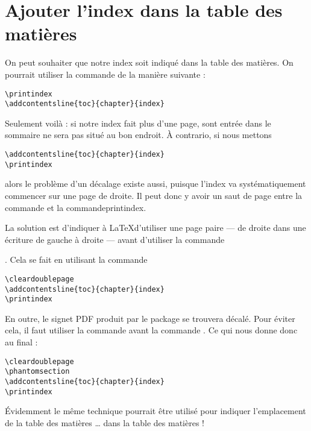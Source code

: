 

\section{Ajouter l'index dans la table des matières}

On peut souhaiter que notre index soit indiqué dans la table des matières. On pourrait utiliser la commande  de la manière suivante :

\begin{verbatim}
\printindex
\addcontentsline{toc}{chapter}{index}
\end{verbatim}

Seulement voilà : si notre index fait plus d'une page, sont entrée dans le sommaire ne sera pas situé au bon endroit. À contrario, si nous mettons

\begin{verbatim}
\addcontentsline{toc}{chapter}{index}
\printindex
\end{verbatim}

alors le problème d'un décalage existe aussi, puisque l'index va systématiquement commencer sur une page de droite. Il peut donc y avoir un saut de page entre la commande  et la commande{printindex}. 

La solution est d'indiquer à \LaTeX d'utiliser une page paire --- de droite dans une écriture de gauche à droite ---  avant d'utiliser la commande \addcontentsline. Cela se fait en utilisant la commande 

\begin{verbatim}
\cleardoublepage
\addcontentsline{toc}{chapter}{index}
\printindex
\end{verbatim}

En outre, le signet PDF produit par le package  se trouvera décalé. Pour éviter cela, il faut utiliser la commande  avant la commande . Ce qui nous donne donc au final :

\begin{verbatim}
\cleardoublepage
\phantomsection
\addcontentsline{toc}{chapter}{index}
\printindex
\end{verbatim}

\begin{anedocte}
Évidemment le même technique pourrait être utilisé pour indiquer l'emplacement de la table des matières … dans la table des matières !
\end{anedocte}
